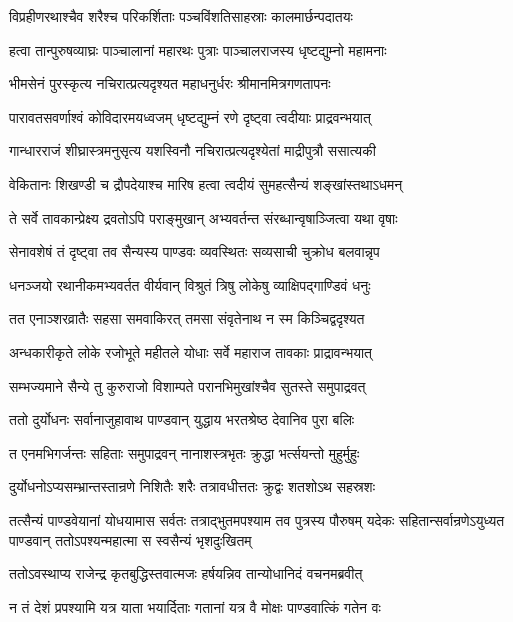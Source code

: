 \twolineshloka
{विप्रहीणरथाश्चैव शरैश्च परिकर्शिताः}
{पञ्चविंशतिसाहस्राः कालमार्छन्पदातयः}


\twolineshloka
{हत्वा तान्पुरुषव्याघ्रः पाञ्चालानां महारथः}
{पुत्राः पाञ्चालराजस्य धृष्टद्युम्नो महामनाः}


\twolineshloka
{भीमसेनं पुरस्कृत्य नचिरात्प्रत्यदृश्यत}
{महाधनुर्धरः श्रीमानमित्रगणतापनः}


\twolineshloka
{पारावतसवर्णाश्वं कोविदारमयध्वजम्}
{धृष्टद्युम्नं रणे दृष्ट्वा त्वदीयाः प्राद्रवन्भयात्}


\twolineshloka
{गान्धारराजं शीघ्रास्त्रमनुसृत्य यशस्विनौ}
{नचिरात्प्रत्यदृश्येतां माद्रीपुत्रौ ससात्यकी}


\twolineshloka
{वेकितानः शिखण्डी च द्रौपदेयाश्च मारिष}
{हत्वा त्वदीयं सुमहत्सैन्यं शङ्खांस्तथाऽधमन्}


\twolineshloka
{ते सर्वे तावकान्प्रेक्ष्य द्रवतोऽपि पराङ्मुखान्}
{अभ्यवर्तन्त संरब्धान्वृषाञ्जित्वा यथा वृषाः}


\twolineshloka
{सेनावशेषं तं दृष्ट्वा तव सैन्यस्य पाण्डवः}
{व्यवस्थितः सव्यसाची चुक्रोध बलवान्नृप}


\twolineshloka
{धनञ्जयो रथानीकमभ्यवर्तत वीर्यवान्}
{विश्रुतं त्रिषु लोकेषु व्याक्षिपद्गाण्डिवं धनुः}


\twolineshloka
{तत एनाञ्शरव्रातैः सहसा समवाकिरत्}
{तमसा संवृतेनाथ न स्म किञ्चिद्वदृश्यत}


\twolineshloka
{अन्धकारीकृते लोके रजोभूते महीतले}
{योधाः सर्वे महाराज तावकाः प्राद्रावन्भयात्}


\twolineshloka
{सम्भज्यमाने सैन्ये तु कुरुराजो विशाम्पते}
{परानभिमुखांश्चैव सुतस्ते समुपाद्रवत्}


\twolineshloka
{ततो दुर्योधनः सर्वानाजुहावाथ पाण्डवान्}
{युद्धाय भरतश्रेष्ठ देवानिव पुरा बलिः}


\twolineshloka
{त एनमभिगर्जन्तः सहिताः समुपाद्रवन्}
{नानाशस्त्रभृतः क्रुद्धा भर्त्सयन्तो मुहुर्मुहुः}


\twolineshloka
{दुर्योधनोऽप्यसम्भ्रान्तस्तान्रणे निशितैः शरैः}
{तत्रावधीत्ततः क्रुद्वः शतशोऽथ सहस्रशः}


तत्सैन्यं पाण्डवेयानां योधयामास सर्वतः
\threelineshloka
{तत्राद्भुतमपश्याम तव पुत्रस्य पौरुषम्}
{यदेकः सहितान्सर्वान्रणेऽयुध्यत पाण्डवान्}
{ततोऽपश्यन्महात्मा स स्वसैन्यं भृशदुःखितम्}


\twolineshloka
{ततोऽवस्थाप्य राजेन्द्र कृतबुद्धिस्तवात्मजः}
{हर्षयन्निव तान्योधानिदं वचनमब्रवीत्}


\twolineshloka
{न तं देशं प्रपश्यामि यत्र याता भयार्दिताः}
{गतानां यत्र वै मोक्षः पाण्डवात्किं गतेन वः}


